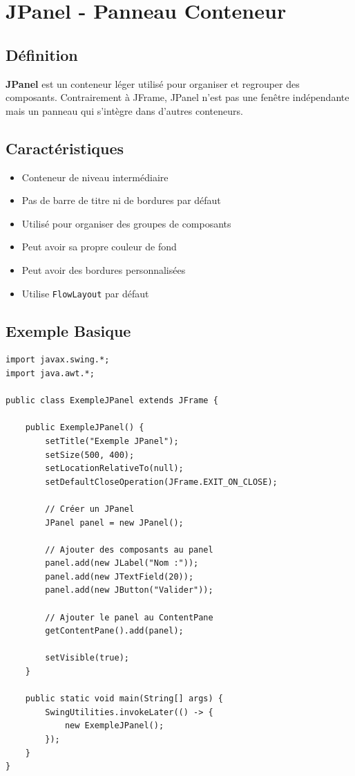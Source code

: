 \documentclass[11pt,a4paper]{article}
\begin{document}
\newpage

\section{JPanel - Panneau Conteneur}

\subsection{Définition}

\textbf{JPanel} est un conteneur léger utilisé pour organiser et regrouper des composants. Contrairement à JFrame, JPanel n'est pas une fenêtre indépendante mais un panneau qui s'intègre dans d'autres conteneurs.

\subsection{Caractéristiques}

\begin{itemize}
    \item Conteneur de niveau intermédiaire
    \item Pas de barre de titre ni de bordures par défaut
    \item Utilisé pour organiser des groupes de composants
    \item Peut avoir sa propre couleur de fond
    \item Peut avoir des bordures personnalisées
    \item Utilise \texttt{FlowLayout} par défaut
\end{itemize}

\subsection{Exemple Basique}

\begin{lstlisting}
import javax.swing.*;
import java.awt.*;

public class ExempleJPanel extends JFrame {
    
    public ExempleJPanel() {
        setTitle("Exemple JPanel");
        setSize(500, 400);
        setLocationRelativeTo(null);
        setDefaultCloseOperation(JFrame.EXIT_ON_CLOSE);
        
        // Créer un JPanel
        JPanel panel = new JPanel();
        
        // Ajouter des composants au panel
        panel.add(new JLabel("Nom :"));
        panel.add(new JTextField(20));
        panel.add(new JButton("Valider"));
        
        // Ajouter le panel au ContentPane
        getContentPane().add(panel);
        
        setVisible(true);
    }
    
    public static void main(String[] args) {
        SwingUtilities.invokeLater(() -> {
            new ExempleJPanel();
        });
    }
}
\end{lstlisting}
\end{document}
